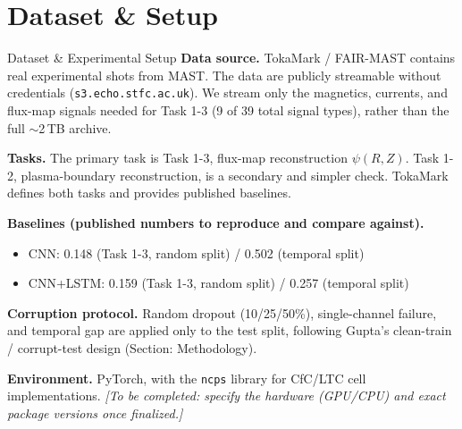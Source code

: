 \documentclass[aspectratio=169]{beamer}
\begin{document}
\section{Dataset \& Setup}
\begin{frame}{Dataset \& Experimental Setup}
  \small
  \textbf{Data source.} TokaMark / FAIR-MAST contains real experimental shots
  from MAST. The data are publicly streamable without credentials
  (\texttt{s3.echo.stfc.ac.uk}). We stream only the magnetics, currents, and
  flux-map signals needed for Task 1-3 (9 of 39 total signal types), rather
  than the full $\sim$2\,TB archive.

  \vspace{4pt}
  \textbf{Tasks.} The primary task is Task 1-3, flux-map reconstruction
  $\psi(R,Z)$. Task 1-2, plasma-boundary reconstruction, is a secondary and
  simpler check. TokaMark defines both tasks and provides published
  baselines.

  \vspace{4pt}
  \textbf{Baselines (published numbers to reproduce and compare against).}
  \begin{itemize}
    \setlength\itemsep{1pt}
    \item CNN: 0.148 (Task 1-3, random split) / 0.502 (temporal split)
    \item CNN+LSTM: 0.159 (Task 1-3, random split) / 0.257 (temporal split)
  \end{itemize}

  \vspace{4pt}
  \textbf{Corruption protocol.} Random dropout (10/25/50\%), single-channel
  failure, and temporal gap are applied only to the test split, following
  Gupta's clean-train / corrupt-test design (Section: Methodology).

  \vspace{2pt}
  \textbf{Environment.} PyTorch, with the \texttt{ncps} library for CfC/LTC
  cell implementations. \textit{[To be completed: specify the hardware
  (GPU/CPU) and exact package versions once finalized.]}
\end{frame}

\end{document}
